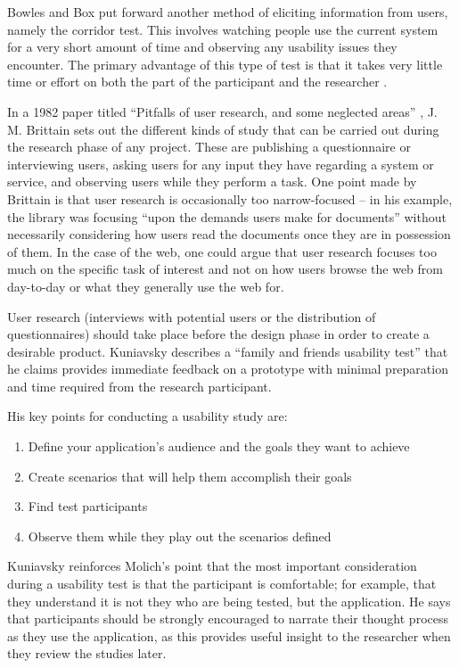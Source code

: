 \documentclass[draft]{scrartcl}
\begin{document}
Bowles and Box put forward another method of eliciting information from users,
namely the corridor test. This involves watching people use the current system
for a very short amount of time and observing any usability issues they
encounter. The primary advantage of this type of test is that it takes very
little time or effort on both the part of the participant and the researcher
\cite{bowles2011undercover}.

In a 1982 paper titled ``Pitfalls of user research, and some neglected areas''
\cite{brittain1982pitfalls}, J. M. Brittain sets out the different kinds of
study that can be carried out during the research phase of any project. These
are publishing a questionnaire or interviewing users, asking users for any
input they have regarding a system or service, and observing users while they
perform a task. One point made by Brittain is that user research is
occasionally too narrow-focused -- in his example, the library was focusing
``upon the demands users make for documents'' without necessarily considering
how users read the documents once they are in possession of them. In the case
of the web, one could argue that user research focuses too much on the
specific task of interest and not on how users browse the web from day-to-day
or what they generally use the web for.

User research (interviews with potential users or the distribution of
questionnaires) should take place before the design phase in order to create a
desirable product. Kuniavsky \cite{kuniavsky2003userexperience} describes a
``family and friends usability test'' that he claims provides immediate
feedback on a prototype with minimal preparation and time required from the
research participant.

His key points for conducting a usability study are:

\begin{enumerate}
  \item Define your application's audience and the goals they want to achieve
  \item Create scenarios that will help them accomplish their goals
  \item Find test participants
  \item Observe them while they play out the scenarios defined
\end{enumerate}

Kuniavsky reinforces Molich's point that the most important consideration
during a usability test is that the participant is comfortable; for example,
that they understand it is not they who are being tested, but the application.
He says that participants should be strongly encouraged to narrate their
thought process as they use the application, as this provides useful insight
to the researcher when they review the studies later.
\end{document}
